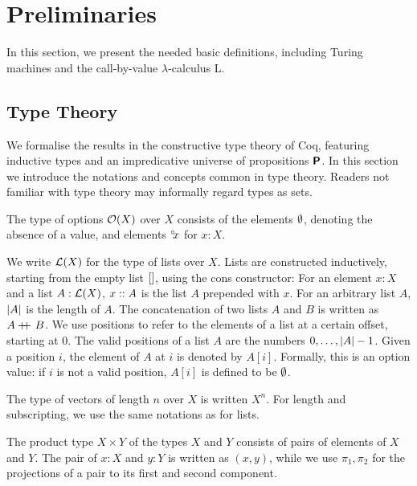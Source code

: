 
\newcommand*{\movel}{\textsf{L}}
\newcommand*{\mover}{\textsf{R}}
\newcommand*{\moven}{\textsf{N}}

\newcommand*{\tmleft}[1]{\textsf{left}~#1}
\newcommand*{\tmright}[1]{\textsf{right}~#1}
\newcommand*{\tmcurrent}[1]{\textsf{current}~#1}

\newcommand{\finType}{\textsf{finType}}


\chapter{Preliminaries}\label{chap:preliminaries}
In this section, we present the needed basic definitions, including Turing machines and the call-by-value $\lambda$-calculus L.

\section{Type Theory}
We formalise the results in the constructive type theory of Coq, featuring inductive types and an impredicative universe of propositions $\textsf{\bfseries P}$. In this section we introduce the notations and concepts common in type theory. Readers not familiar with type theory may informally regard types as sets.

The type of options $\mathcal{O}{(X)}$ over $X$ consists of the elements $\emptyset$, denoting the absence of a value, and elements $\degree\kern-0.5exx$ for $x : X$.

We write $\mathcal{L} (X)$ for the type of lists over $X$. Lists are constructed inductively, starting from the empty list $[]$, using the cons constructor: For an element $x : X$ and a list $A : \mathcal{L} (X)$, $x::{} A$ is the list $A$ prepended with $x$.
For an arbitrary list $A$, $|A|$ is the length of $A$. 
The concatenation of two lists $A$ and $B$ is written as $A +\kern-1.3ex+\kern0.8ex{} B$. 
We use positions to refer to the elements of a list at a certain offset, starting at 0. The valid positions of a list $A$ are the numbers $0, \ldots, |A|-1$. 
Given a position $i$, the element of $A$ at $i$ is denoted by $A[i]$. Formally, this is an option value: if $i$ is not a valid position, $A[i]$ is defined to be $\emptyset{}$. 

The type of vectors of length $n$ over $X$ is written $X^n$. For length and subscripting, we use the same notations as for lists.

The product type $X \times Y$ of the types $X$ and $Y$ consists of pairs of elements of $X$ and $Y$. The pair of $x : X$ and $y : Y$ is written as $(x, y)$, while we use $\pi_1, \pi_2$ for the projections of a pair to its first and second component. 

